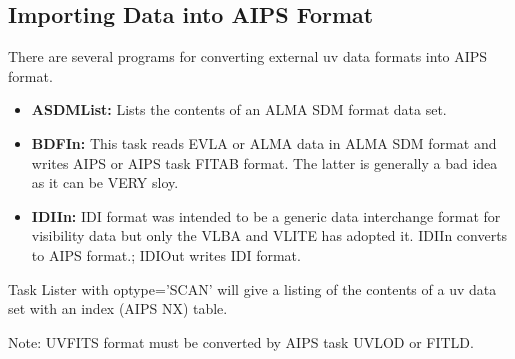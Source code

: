\documentclass[11pt]{report}
\begin{document}
\subsection{Importing Data into AIPS Format}
There are several programs for converting external uv data formats
into AIPS format.
\begin{itemize}
\item {\bf ASDMList:} Lists the contents of an ALMA SDM format data
  set.
\item {\bf BDFIn:} This task reads EVLA or ALMA data in ALMA SDM
  format and writes AIPS or AIPS task FITAB format.
The latter is generally a bad idea as it can be VERY sloy.
\item {\bf IDIIn:} IDI format was intended to be a generic data
  interchange format for visibility data but only the VLBA and VLITE
  has adopted it.
  IDIIn converts to AIPS format.; IDIOut writes IDI format.
\end{itemize}
Task Lister with optype='SCAN' will give a listing of the contents of
a uv data set with an index (AIPS NX) table.

Note: UVFITS format must be converted by AIPS task UVLOD or FITLD.
\end{document}
